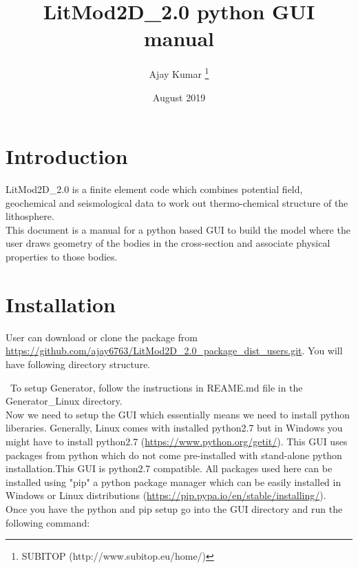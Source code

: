 \documentclass[14pt]{article}
\title{LitMod2D\_2.0 python GUI manual}
\author[1]{Ajay Kumar \thanks{SUBITOP (http://www.subitop.eu/home/)}}
\affil[1]{Group of Dynamics of the Lithosphere, ICTJA-CSIC Barcelona, Spain \\ Email: ajay6763@gmail.com}
\date{August 2019}
\begin{document}
\begin{titlepage}
\maketitle
\end{titlepage}

\section{Introduction}
LitMod2D\_2.0 is a finite element code which combines potential field, geochemical and seismological data to work out thermo-chemical structure of the lithosphere.\\
This document is a manual for a python based GUI to build the model where the user draws geometry of the bodies in the cross-section and associate physical properties to those bodies.

\section{Installation}
User can download or clone the package from \url{https://github.com/ajay6763/LitMod2D_2.0_package_dist_users.git}. You will have following directory structure.
  

\
To setup Generator, follow the instructions in REAME.md file in the Generator\_Linux directory.\\
Now we need to setup the GUI which essentially means we need to install python liberaries. Generally, Linux comes with installed python2.7 but in Windows you might have to install python2.7 (\url{https://www.python.org/getit/}).
This GUI uses packages from python which do not come pre-installed with stand-alone python installation.This GUI is python2.7 compatible. All packages used here can be installed using "pip" a python package manager which can be easily installed in Windows or Linux distributions (\url{https://pip.pypa.io/en/stable/installing/}).\\

Once you have the python and pip setup go into the GUI directory and run the following command: \\
\end{document}
